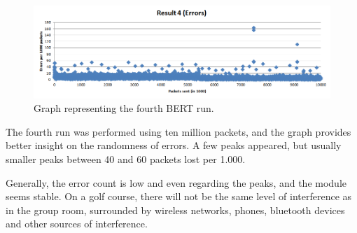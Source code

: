 \begin{figure}[h!]
\hspace*{-2cm}
\includegraphics[width=1.3\textwidth]{chapters/test/figures/res4.png}
\caption{Graph representing the fourth BERT run.}
\label{fig:bert3}
\end{figure}

The fourth run was performed using ten million packets, and the graph provides better insight on the randomness of errors. A few peaks appeared, but usually smaller peaks between 40 and 60 packets lost per 1.000.

Generally, the error count is low and even regarding the peaks, and the module seems stable. On a golf course, there will not be the same level of interference as in the group room, surrounded by wireless networks, phones, bluetooth devices and other sources of interference.

